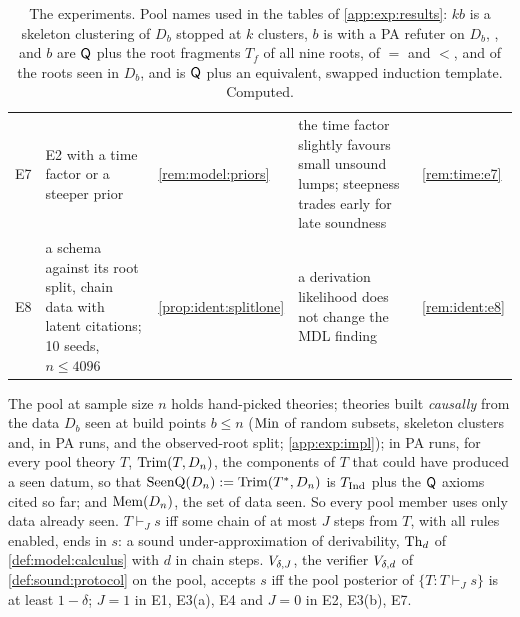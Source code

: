 \begin{table}[!t]
\begin{tabularx}{\textwidth}{@{}l>{\raggedright\arraybackslash}p{}>{\raggedright\arraybackslash}p{}>{\raggedright\arraybackslash}X>{\raggedright\arraybackslash}p{}@{}}
E7 & E2 with a time factor or a steeper prior & \cref{rem:model:priors} & the time factor slightly favours small unsound lumps; steepness trades early for late soundness & \cref{rem:time:e7}\\
E8 & a schema against its root split, chain data with latent citations; 10 seeds, $n\le4096$ & \cref{prop:ident:splitlone} & a derivation likelihood does not change the MDL finding & \cref{rem:ident:e8}\\
\bottomrule
\end{tabularx}
\caption{The experiments. Pool names used in the tables of \cref{app:exp:results}: $k$$b$ is a skeleton clustering of $D_b$ stopped at $k$ clusters, $b$ is \DTRC{} with a PA refuter on $D_b$, ,  and $b$ are $\mathsf{Q}$ plus the root fragments $T_f$ of all nine roots, of $=$ and $<$, and of the roots seen in $D_b$, and  is $\mathsf{Q}$ plus an equivalent, swapped induction template. Computed.}\label{tab:exp:summary}
\end{table}

The pool at sample size $n$ holds hand-picked theories; theories built \emph{causally} from the data $D_b$ seen at build points $b\le n$ ($\mathrm{Min}$ of random subsets, skeleton clusters and, in PA runs, \DTRC{} and the observed-root split; \cref{app:exp:impl}); in PA runs, for every pool theory $T$, $\mathrm{Trim}(T,D_n)$, the components of $T$ that could have produced a seen datum, so that $\mathrm{SeenQ}(D_n):=\mathrm{Trim}(T^*,D_n)$ is $T_{\mathrm{Ind}}$ plus the $\mathsf{Q}$ axioms cited so far; and $\mathrm{Mem}(D_n)$, the set of data seen. So every pool member uses only data already seen. $T\vdash_Js$ iff some chain of at most $J$ steps from $T$, with all rules enabled, ends in $s$: a sound under-approximation of derivability, $\mathrm{Th}_d$ of \cref{def:model:calculus} with $d$ in chain steps. $V_{\delta,J}$, the verifier $V_{\delta,d}$ of \cref{def:sound:protocol} on the pool, accepts $s$ iff the pool posterior of $\{T:T\vdash_Js\}$ is at least $1-\delta$; $J=1$ in E1, E3(a), E4 and $J=0$ in E2, E3(b), E7.

